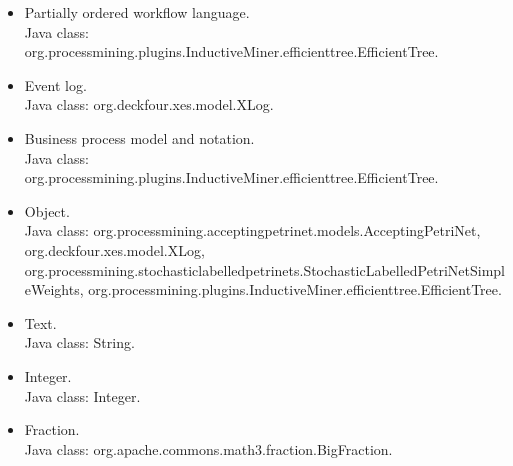 {\begin{itemize}
\item Partially ordered workflow language.\\Java class: org.processmining.plugins.InductiveMiner.efficienttree.EfficientTree.
\item Event log.\\Java class: org.deckfour.xes.model.XLog.
\item Business process model and notation.\\Java class: org.processmining.plugins.InductiveMiner.efficienttree.EfficientTree.
\item Object.\\Java class: org.processmining.acceptingpetrinet.models.AcceptingPetriNet, org.deckfour.xes.model.XLog, org.processmining.stochasticlabelledpetrinets.StochasticLabelledPetriNetSimpleWeights, org.processmining.plugins.InductiveMiner.efficienttree.EfficientTree.
\item Text.\\Java class: String.
\item Integer.\\Java class: Integer.
\item Fraction.\\Java class: org.apache.commons.math3.fraction.BigFraction.
\end{itemize}}
